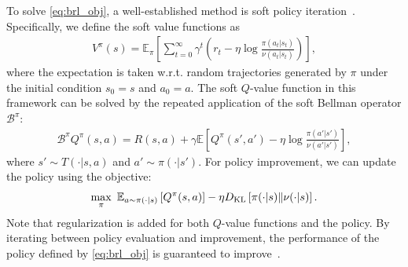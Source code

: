 To solve \eqref{eq:brl_obj}, a well-established method is soft policy iteration~\citep{sac,brac}. Specifically, we define the soft value functions as
\begin{equation}\label{eq:expected_q}
    \begin{aligned}
        V^\pi(s)=\mathbb{E}_\pi\left[\sum_{t=0}^\infty\gamma^t\left(r_t-\eta\log\frac{\pi(a_t|s_t)}{\nu(a_t|s_t)}\right)\right], 
    \end{aligned}
\end{equation}
where the expectation is taken w.r.t. random trajectories generated by $\pi$ under the initial condition $s_0=s$ and $a_0=a$. The soft $Q$-value function in this framework can be solved by the repeated application of the soft Bellman operator $\mathcal{B}^\pi$:
\begin{equation}\label{eq:expected_bellman}
    \begin{aligned}
        \mathcal{B}^\pi Q^\pi(s, a)=R(s, a)+\gamma \mathbb{E}\left[Q^\pi(s', a')-\eta \log \frac{\pi(a'|s')}{\nu(a'|s')}\right],
    \end{aligned}
\end{equation}
where $s'\sim T(\cdot|s, a)$ and $a'\sim\pi(\cdot|s')$.
For policy improvement, we can update the policy using the objective:
\begin{equation}\label{eq:expected_pi}
    \begin{aligned}
        \max_{\pi}\ \mathbb{E}_{a\sim \pi(\cdot|s)}\left[Q^\pi(s, a)\right] - \eta D_{\rm KL}\left[\pi(\cdot|s)\|\nu(\cdot|s)\right]. 
    \end{aligned}
\end{equation}
Note that regularization is added for both $Q$-value functions and the policy. By iterating between policy evaluation and improvement, the performance of the policy defined by \eqref{eq:brl_obj} is guaranteed to improve~\citep{sac}. 


